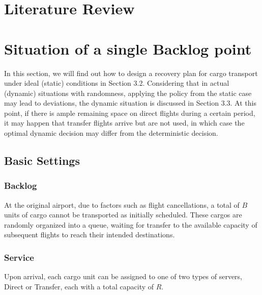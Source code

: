 \documentclass[opre,sglanonrev]{informs4}
\begin{document}
\cite{Erlang1948,Dantzig1955,Dynkin1956,Bellman1957DP,Little1961,Skorokhod1961,McKean1965,Iglehart1965}

\section{Literature Review}

\section{Situation of a single Backlog point}
In this section, we will find out how to design a recovery plan for cargo transport under ideal (static) conditions in Section 3.2. Considering that in actual (dynamic) situations with randomness, applying the policy from the static case may lead to deviations, the dynamic situation is discussed in Section 3.3. At this point, if there is ample remaining space on direct flights during a certain period, it may happen that transfer flights arrive but are not used, in which case the optimal dynamic decision may differ from the deterministic decision.

\subsection{Basic Settings}
\label{sec:basic_settings}


\subsubsection{Backlog}
At the original airport, due to factors such as flight cancellations, a total of \( B \) units of cargo cannot be transported as initially scheduled. These cargos are randomly organized into a queue, waiting for transfer to the available capacity of subsequent flights to reach their intended destinations.

\subsubsection{Service}
Upon arrival, each cargo unit can be assigned to one of two types of servers, Direct or Transfer, each with a total capacity of \( R \).
\end{document}
